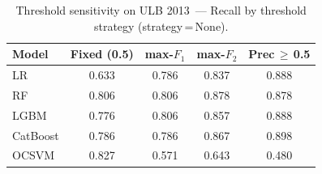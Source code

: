 \begin{table}[ht]
\centering
\caption{Threshold sensitivity on ULB 2013~--- Recall by threshold strategy (strategy\,=\,None).}
\label{tab:threshold_ulb_recall}
\begin{tabular}{l c c c c}
\toprule
Model & Fixed (0.5) & max-$F_1$ & max-$F_2$ & Prec\,$\geq$\,0.5 \\
\midrule
LR         & 0.633 & 0.786 & 0.837 & 0.888 \\
RF         & 0.806 & 0.806 & 0.878 & 0.878 \\
LGBM       & 0.776 & 0.806 & 0.857 & 0.888 \\
CatBoost   & 0.786 & 0.786 & 0.867 & 0.898 \\
OCSVM      & 0.827 & 0.571 & 0.643 & 0.480 \\
\bottomrule
\end{tabular}
\end{table}